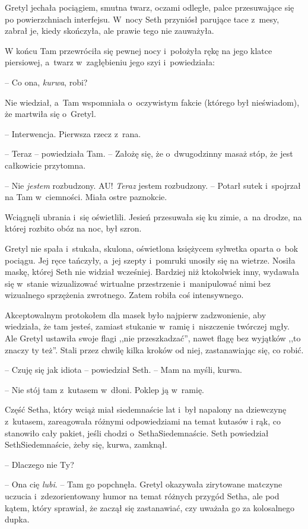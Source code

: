 \documentclass[oneside,polish,11pt,sfheadings]{mwbk}
\begin{document}
Gretyl jechała pociągiem, smutna twarz, oczami odległe, palce
przesuwające się po powierzchniach interfejsu. W~nocy Seth przyniósł
parujące tace z~mesy, zabrał je, kiedy skończyła, ale prawie tego nie
zauważyła.

W końcu Tam przewróciła się pewnej nocy i~położyła rękę na jego klatce
piersiowej, a~twarz w~zagłębieniu jego szyi i~powiedziała: 

-- Co ona,
\textit{kurwa}, robi? 

Nie wiedział, a~Tam wspomniała o~oczywistym fakcie
(którego był nieświadom), że martwiła się o~Gretyl.

-- Interwencja. Pierwsza rzecz z~rana.

-- Teraz -- powiedziała Tam. -- Założę się, że o~dwugodzinny masaż stóp, że
jest całkowicie przytomna.

-- Nie \textit{jestem }rozbudzony. AU! \textit{Teraz} jestem rozbudzony. -- Potarł sutek i~spojrzał na Tam w~ciemności. Miała ostre paznokcie.

Wciągnęli ubrania i~się oświetlili. Jesień przesuwała się ku zimie, a~na
drodze, na której rozbito obóz na noc, był szron.

Gretyl nie spała i~stukała, skulona, oświetlona księżycem sylwetka
oparta o~bok pociągu. Jej ręce tańczyły, a~jej szepty i~pomruki unosiły
się na wietrze. Nosiła maskę, której Seth nie widział wcześniej.
Bardziej niż ktokolwiek inny, wydawała się w~stanie wizualizować
wirtualne przestrzenie i~manipulować nimi bez wizualnego sprzężenia
zwrotnego. Zatem robiła coś intensywnego.

Akceptowalnym protokołem dla masek było najpierw zadzwonienie, aby
wiedziała, że tam jesteś, zamiast stukanie w~ramię i~niszczenie twórczej
mgły. Ale Gretyl ustawiła swoje flagi ,,nie przeszkadzać'', nawet flagę
bez wyjątków ,,to znaczy ty też''. Stali przez chwilę kilka kroków od
niej, zastanawiając się, co robić.

-- Czuję się jak idiota -- powiedział Seth. -- Mam na myśli, kurwa.

-- Nie stój tam z~kutasem w~dłoni. Poklep ją w~ramię.

Część Setha, który wciąż miał siedemnaście lat i~był napalony na
dziewczynę z~kutasem, zareagowała różnymi odpowiedziami na temat kutasów
i rąk, co stanowiło cały pakiet, jeśli chodzi o~Setha\dywiz Siedemnaście. Seth
powiedział Seth\dywiz Siedemnaście, żeby się, kurwa, zamknął.

-- Dlaczego nie Ty?

-- Ona cię \textit{lubi}. -- Tam go popchnęła. Gretyl okazywała zirytowane
matczyne uczucia i~zdezorientowany humor na temat różnych przygód Setha,
ale pod kątem, który sprawiał, że zaczął się zastanawiać, czy uważała go
za kolosalnego dupka.
\end{document}
